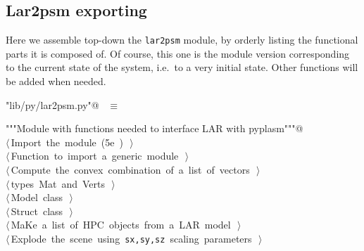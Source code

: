\documentclass[11pt,oneside]{article}	%
\begin{document}
\subsection{Lar2psm exporting}
\label{sec:lar2psm}
Here we assemble top-down the \texttt{lar2psm} module, by orderly listing the functional parts it is composed of. Of course, this one is the module version corresponding to the current state of the system, i.e.~to a very initial state. Other functions will be added when needed.
\begin{flushleft} \small \label{scrap15}
\verb@"lib/py/lar2psm.py"@\nobreak\ {\footnotesize {} }$\equiv$
\vspace{-1ex}
\begin{list}{}{} \item
\mbox{}\verb@"""Module with functions needed to interface LAR with pyplasm"""@\\
\mbox{}\verb@@\hbox{$\langle\,$Import the module\nobreak\ ({\footnotesize 5e\label{scrap16}
 }\mbox{}\verb@simplexn@ ) {\footnotesize {}}$\,\rangle$}\verb@@\\
\mbox{}\verb@@\hbox{$\langle\,$Function to import a generic module\nobreak\ {\footnotesize {}}$\,\rangle$}\verb@@\\
\mbox{}\verb@@\hbox{$\langle\,$Compute the convex combination of a list of vectors\nobreak\ {\footnotesize {}}$\,\rangle$}\verb@@\\
\mbox{}\verb@@\hbox{$\langle\,$types Mat and Verts\nobreak\ {\footnotesize {}}$\,\rangle$}\verb@@\\
\mbox{}\verb@@\hbox{$\langle\,$Model class\nobreak\ {\footnotesize {}}$\,\rangle$}\verb@@\\
\mbox{}\verb@@\hbox{$\langle\,$Struct class\nobreak\ {\footnotesize {}}$\,\rangle$}\verb@@\\
\mbox{}\verb@@\hbox{$\langle\,$MaKe a list of HPC objects from a LAR model\nobreak\ {\footnotesize {}}$\,\rangle$}\verb@@\\
\mbox{}\verb@@\hbox{$\langle\,$Explode the scene using \texttt{sx,sy,sz} scaling parameters\nobreak\ {\footnotesize {}}$\,\rangle$}\verb@@\\
\mbox{}\verb@@{\NWsep}
\end{list}
\vspace{-2ex}
\end{flushleft}
\end{document}
